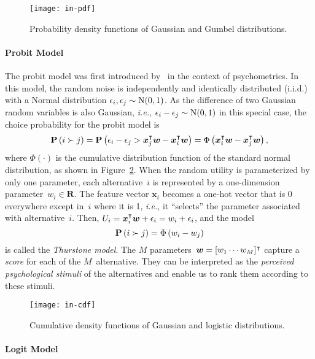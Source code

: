 \begin{figure}
	\centering
	\texttt{[image: in-pdf]}
	\caption{Probability density functions of Gaussian and Gumbel distributions.}
	\label{in:fig:pdf}
\end{figure}

\paragraph{Probit Model}

The probit model was first introduced by~\citet{thurstone1927law} in the context of psychometrics.
In this model, the random noise is independently and identically distributed (i.i.d.) with a Normal distribution $\epsilon_i, \epsilon_j \sim \mathrm{N}( 0, 1 )$.
As the difference of two Gaussian random variables is also Gaussian, \textit{i.e.}, $\epsilon_i - \epsilon_j \sim \mathrm{N}( 0, 1 )$ in this special case, the choice probability for the probit model is
\begin{equation}
	\label{in:eq:probit}
	\mathbf{P}\left( i \succ j \right) = \mathbf{P}\left( \epsilon_i - \epsilon_j > \bm{x}_j^\intercal \bm{w} - \bm{x}_i^\intercal \bm{w} \right) = \Phi \left( \bm{x}_i^\intercal \bm{w} - \bm{x}_j^\intercal \bm{w} \right),
\end{equation}
where $\Phi( \cdot )$ is the cumulative distribution function of the standard normal distribution, as shown in Figure~\ref{in:fig:cdf}.
When the random utility is parameterized by only one parameter, each alternative~$i$ is represented by a one-dimension parameter~$w_i \in \mathbf{R}$.
The feature vector $\bm{x}_i$ becomes a one-hot vector that is 0 everywhere except in~$i$ where it is 1, \textit{i.e.}, it ``selects'' the parameter associated with alternative~$i$.
Then, $U_i = \bm{x}_i^\intercal \bm{w} + \epsilon_i = w_i + \epsilon_i$, and the model
\begin{equation*}
	\mathbf{P}\left( i \succ j \right) = \Phi \left( w_i - w_j \right)
\end{equation*}
is called the \emph{Thurstone model}.
The $M$ parameters~$\bm{w} = [w_1 \cdots w_M]^\intercal$ capture a \emph{score} for each of the $M$~alternative.
They can be interpreted as the \emph{perceived psychological stimuli} of the alternatives and enable us to rank them according to these stimuli.

\begin{figure}
	\centering
	\texttt{[image: in-cdf]}
	\caption{Cumulative density functions of Gaussian and logistic distributions.}
	\label{in:fig:cdf}
\end{figure}

\paragraph{Logit Model}

